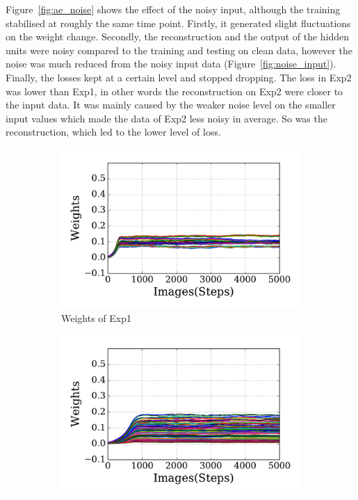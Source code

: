 Figure~\ref{fig:ae_noise} shows the effect of the noisy input, although the training stabilised at roughly the same time point.
Firstly, it generated slight fluctuations on the weight change.
Secondly, the reconstruction and the output of the hidden units were noisy compared to the training and testing on clean data, however the noise was much reduced from the noisy input data (Figure~\ref{fig:noise_input}). 
Finally, the losses kept at a certain level and stopped dropping.
The loss in Exp2 was lower than Exp1, in other words the reconstruction on Exp2 were closer to the input data.
It was mainly caused by the weaker noise level on the smaller input values which made the data of Exp2 less noisy in average.
So was the reconstruction, which led to the lower level of loss.
\begin{figure}
	\centering
	\begin{subfigure}[t]{0.45\textwidth}
		\includegraphics[width=\textwidth]{pics_sdlm/30_exp_RBM/exp1_weights_non.pdf}
		\caption{Weights of Exp1}
	\end{subfigure}
	\begin{subfigure}[t]{0.45\textwidth}
		\includegraphics[width=\textwidth]{pics_sdlm/30_exp_RBM/exp2_weights_non.pdf}

\end{subfigure}
\end{figure}
